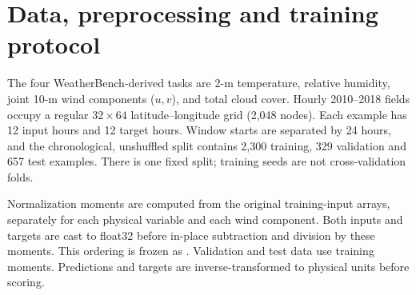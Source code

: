 \documentclass[10pt,a4paper]{article}
\begin{document}
\section{Data, preprocessing and training protocol}
The four WeatherBench-derived tasks are 2-m temperature, relative humidity, joint 10-m wind components ($u,v$), and total cloud cover. Hourly 2010--2018 fields occupy a regular $32\times64$ latitude--longitude grid (2,048 nodes). Each example has 12 input hours and 12 target hours. Window starts are separated by 24 hours, and the chronological, unshuffled split contains 2,300 training, 329 validation and 657 test examples. There is one fixed split; training seeds are not cross-validation folds.

Normalization moments are computed from the original training-input arrays, separately for each physical variable and each wind component. Both inputs and targets are cast to float32 before in-place subtraction and division by these moments. This ordering is frozen as . Validation and test data use training moments. Predictions and targets are inverse-transformed to physical units before scoring.
\end{document}
